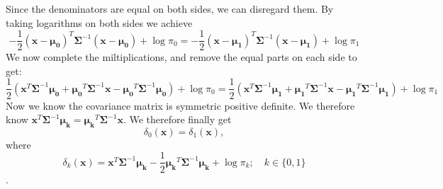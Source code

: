 \documentclass[]{article}
\begin{document}
\begin{itemize}
  Since the denominators are equal on both sides, we can disregard them.
  By taking logarithms on both sides we achieve
  \[-\frac{1}{2} (\boldsymbol{x}-\boldsymbol{\mu_0})^T\boldsymbol{\Sigma}^{-1}(\boldsymbol{x}-\boldsymbol{\mu_0}) + \log{\pi_0}=-\frac{1}{2} (\boldsymbol{x}-\boldsymbol{\mu_1})^T\boldsymbol{\Sigma}^{-1}(\boldsymbol{x}-\boldsymbol{\mu_1}) + \log{\pi_1}\]
  We now complete the miltiplications, and remove the equal parts on
  each side to get:
  \[\frac{1}{2}(\boldsymbol{x}^T\boldsymbol{\Sigma}^{-1}\boldsymbol{\mu_0} +\boldsymbol{\mu_0}^T\boldsymbol{\Sigma}^{-1}\boldsymbol{x} - \boldsymbol{\mu_0}^T\boldsymbol{\Sigma}^{-1}\boldsymbol{\mu_0}) + \log{\pi_0}=\frac{1}{2}(\boldsymbol{x}^T\boldsymbol{\Sigma}^{-1}\boldsymbol{\mu_1} +\boldsymbol{\mu_1}^T\boldsymbol{\Sigma}^{-1}\boldsymbol{x} - \boldsymbol{\mu_1}^T\boldsymbol{\Sigma}^{-1}\boldsymbol{\mu_1}) + \log{\pi_1}\]
  Now we know the covariance matrix is symmetric positive definite. We
  therefore know
  \(\boldsymbol{x}^T\boldsymbol{\Sigma}^{-1}\boldsymbol{\mu_k} =\boldsymbol{\mu_k}^T\boldsymbol{\Sigma}^{-1}\boldsymbol{x}\).
  We therefore finally get
  \[\delta_0(\boldsymbol{x})=\delta_1(\boldsymbol{x}),\] where
  \[\delta_k(\boldsymbol{x})=\boldsymbol{x}^T\boldsymbol{\Sigma}^{-1}\boldsymbol{\mu_k}- \frac{1}{2}\boldsymbol{\mu_k}^T\boldsymbol{\Sigma}^{-1}\boldsymbol{\mu_k} + \log{\pi_k}; \quad k\in \{0, 1\}\].
\end{itemize}
\end{document}

